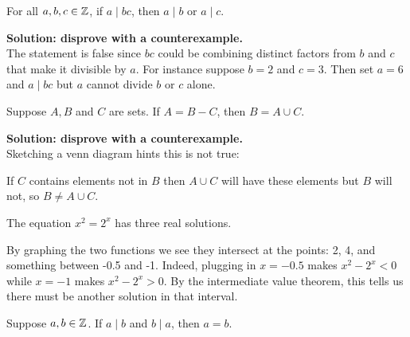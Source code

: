\documentclass{article}
\begin{document}
\begin{problem}
For all $a, b, c \in \mathbb{Z}$, if $a \mid bc$, then $a \mid b$ or $a \mid c$.\
\end{problem}

\textbf{Solution: disprove with a counterexample.}
\\

The statement is false since $bc$ could be combining distinct factors from $b$ and $c$ that make it divisible by $a$. For instance suppose $b = 2$ and $c = 3$. Then set $a = 6$ and $a \mid bc$ but $a$ cannot divide $b$ or $c$ alone.

\begin{problem}
Suppose $A, B$ and $C$ are sets. If $A = B - C$, then $B = A \cup C$.
\end{problem}

\textbf{Solution: disprove with a counterexample.}
\\

Sketching a venn diagram hints this is not true:


\begin{center}
\end{center}

If $C$ contains elements not in $B$ then $A \cup C$ will have these elements but $B$ will not, so $B \neq A \cup C$.

\begin{problem}
The equation $x^2 = 2^x$ has three real solutions.
\end{problem}

By graphing the two functions we see they intersect at the points: 2, 4, and something between -0.5 and -1. Indeed, plugging in $x = -0.5$ makes $x^2 - 2^x < 0$ while $x = -1$ makes $x^2 - 2^x > 0$. By the intermediate value theorem, this tells us there must be another solution in that interval.

\begin{problem}
Suppose $a, b \in \mathbb{Z}$. If $a \mid b$ and $b \mid a$, then $a = b$.
\end{problem}
\end{document}
